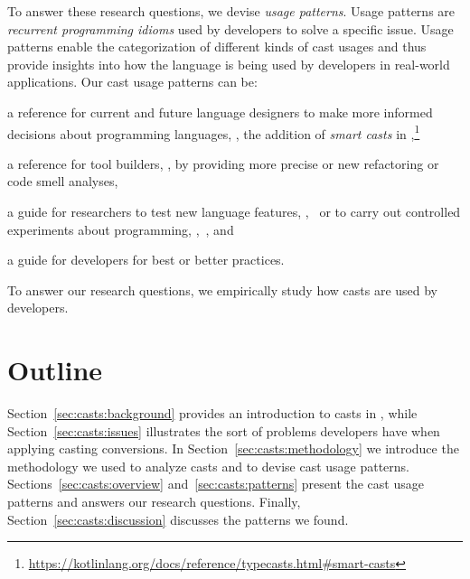 To answer these research questions, we devise
\emph{usage patterns}.
Usage patterns are \emph{recurrent programming idioms} used by developers to solve a specific issue.
Usage patterns enable the categorization of different kinds of cast usages and
thus provide insights into how the language is being used by developers in real-world applications.
Our cast usage patterns can be:
\begin{inparaenum}[(1)]
\item a reference for current and future language designers
to make more informed decisions about programming languages,
\eg{},
the addition of \emph{smart casts} in ,\footnote{\url{https://kotlinlang.org/docs/reference/typecasts.html\#smart-casts}}
\item a reference for tool builders, \eg{}, by providing more precise or new
  refactoring or code smell analyses,
\item a guide for researchers to test new language features, \eg{},~\cite{wintherGuardedTypePromotion2011} or to carry out controlled
  experiments about programming, \eg{},~\cite{stuchlikStaticVsDynamic2011}, and
\item a guide for developers for best or better practices.
\end{inparaenum}
To answer our research questions,
we empirically study how casts are used by developers.

\section*{Outline}

Section~\ref{sec:casts:background} provides an introduction to casts in \java{},
while Section~\ref{sec:casts:issues} illustrates the sort of problems developers have when applying casting conversions.
In Section~\ref{sec:casts:methodology} we introduce the methodology we used to analyze casts and to devise cast usage patterns.
Sections~\ref{sec:casts:overview} and~\ref{sec:casts:patterns} present the cast usage patterns and answers our research questions.
Finally, Section~\ref{sec:casts:discussion} discusses the patterns we found.


\newcommand\urlbox{\null\hfill\colorbox{lightgray}{\scriptsize\url{\urlvar}}}
\newcommand\bcbox{\null\hfill\colorbox{light-orange}{\footnotesize Bytecode}}
\newcommand\qlbox{\null\hfill\colorbox{light-orange}{\footnotesize\ql{}}}
\newcommand\scalabox{\null\hfill\colorbox{light-orange}{\footnotesize\scala{}}}







